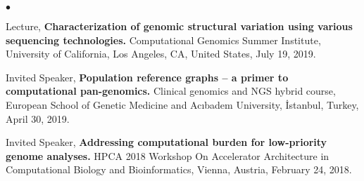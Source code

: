 \documentclass[margin,line]{res}
\newenvironment{list2}{
  \begin{list}{$\bullet$}{%
      \setlength{\itemsep}{0.1cm}
      \setlength{\parsep}{0in} \setlength{\parskip}{0in}
      \setlength{\topsep}{0in} \setlength{\partopsep}{0in} 
      \setlength{\leftmargin}{0.2in}}}{\end{list}}
\newcommand{\junk}[1]{}
\begin{document}
\begin{resume}
\begin{list2}
\item
  Lecture, 
      {\bf  Characterization of genomic structural variation using various sequencing technologies.}
  Computational Genomics Summer Institute, University of California, Los Angeles, CA, United States,
  July 19, 2019.


\item
Invited Speaker,
{\bf Population reference graphs – a primer to computational pan-genomics.}
 Clinical genomics and NGS hybrid course, European School of Genetic Medicine and Acıbadem University, İstanbul, Turkey, April 30, 2019.
 
 
  \junk{
  
  
\item
  Invited Speaker, 
  {\bf Algorithms to characterize genomic structural variation using high-throughput sequencing technologies.}
  Dept of Biomedical Informatics at Harvard Medical School, Boston, MA, United  States, November 29, 2018.
 
  
\item
  Lecture, 
  {\bf  Characterization of genomic structural variation using various sequencing technologies.}
  Computational Genomics Summer Institute, University of California, Los Angeles, CA, United States,
  July 17, 2018.
  }
  \junk{
\item
  Invited Speaker, 
  {\bf  Characterization of  genome structural variation and large inversions using high throughput sequencing.}
  ETH Zürich, Switzerland, May 7, 2018.
\item
  Invited Speaker, 
  {\bf  Characterization of  genome structural variation and large inversions using high throughput sequencing.}
  Indiana University, Bloomington, IN, United States, April 4, 2018.
}

\item
  Invited Speaker, 
  {\bf Addressing computational burden for low-priority genome analyses.}
  HPCA 2018 Workshop On Accelerator Architecture in Computational Biology and Bioinformatics,
  Vienna, Austria, February 24, 2018.

\junk{
\item
  Lecture, 
  {\bf  Next-generation sequence characterization of complex genome structural variation.}
  Computational Genomics Summer Institute, University of California, Los Angeles, CA, United States,
  July 11, 2017.
}
  \junk{

\item
  Invited Speaker, 
  {\bf Kodlamayan genomu anlamlandırmak.} {\it (in Turkish)}
  3$^{rd}$ Course on Neurogenetics, İstanbul, Turkey, June 1, 2017.
  
}
\end{list2}
\end{resume}
\end{document}
